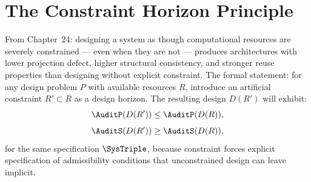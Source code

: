 \section{The Constraint Horizon Principle}
\label{app-g:constraint-horizon}

From Chapter~24: designing a system as though computational
resources are severely constrained --- even when they
are not --- produces architectures with lower projection
defect, higher structural consistency, and stronger
reuse properties than designing without explicit constraint.
The formal statement: for any design problem $P$ with
available resources $R$, introduce an artificial
constraint $R' \subset R$ as a design horizon. The
resulting design $D(R')$ will exhibit:
\[
  \AuditP(D(R')) \le \AuditP(D(R)),
\]
\[
  \AuditS(D(R')) \ge \AuditS(D(R)),
\]
for the same specification $\SysTriple$, because constraint
forces explicit specification of admissibility conditions
that unconstrained design can leave implicit.
